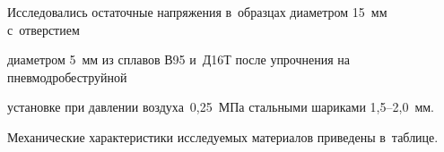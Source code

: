 


\date{20/VII/2009} %









\maketitle



\small





Исследовались остаточные напряжения в~образцах диаметром 15~мм с~отверстием

диаметром 5~мм из сплавов В95 и~Д16Т после упрочнения на пневмодробеструйной

установке при давлении воздуха~0,25~МПа стальными шариками 1,5--2,0~мм.

Механические характеристики исследуемых материалов приведены в~таблице.







